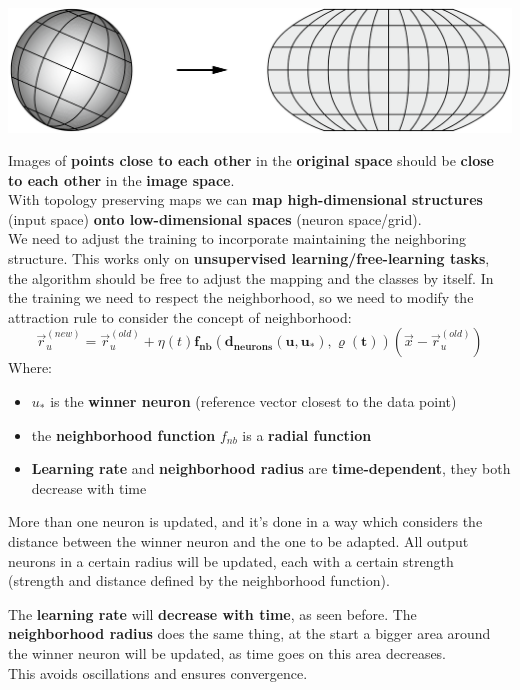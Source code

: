 \begin{center}
	\includegraphics[width=0.9\columnwidth]{img/NN/topology1}
\end{center}

Images of \textbf{points close to each other} in the \textbf{original space} should be \textbf{close to each other} in the \textbf{image space}.\\

With topology preserving maps we can \textbf{map high-dimensional structures} (input space) \textbf{onto low-dimensional spaces} (neuron space/grid).\\

We need to adjust the training to incorporate maintaining the neighboring structure. This works only on \textbf{unsupervised learning/free-learning tasks}, the algorithm should be free to adjust the mapping and the classes by itself. In the training we need to respect the neighborhood, so we need to modify the attraction rule to consider the concept of neighborhood:
$$ \vec{r}_u^{(new)} = \vec{r}_u^{(old)} + \eta(t) \bm{f_{nb} \left(d_{neurons} (u, u_{\ast}), \varrho (t)\right)} (\vec{x} - \vec{r}_u^{(old)}) $$
Where: 
\begin{itemize}
	\item $u_\ast$ is the \textbf{winner neuron} (reference vector closest to the data point)
	\item the \textbf{neighborhood function} $f_{nb}$ is a \textbf{radial function}
	\item \textbf{Learning rate} and \textbf{neighborhood radius} are \textbf{time-dependent}, they both decrease with time
\end{itemize}
More than one neuron is updated, and it's done in a way which considers the distance between the winner neuron and the one to be adapted. All output neurons in a certain radius will be updated, each with a certain strength (strength and distance defined by the neighborhood function).\\

\newpage

The \textbf{learning rate} will \textbf{decrease with time}, as seen before. The \textbf{neighborhood radius} does the same thing, at the start a bigger area around the winner neuron will be updated, as time goes on this area decreases.\\
This avoids oscillations and ensures convergence.\\

